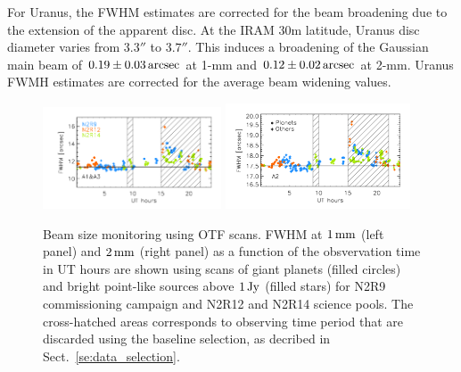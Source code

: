 For Uranus, the FWHM estimates are corrected for the beam broadening due
to the extension of the apparent disc. At the IRAM 30m latitude,
Uranus disc diameter varies from $3.3''$ to $3.7''$. This induces a
broadening of the Gaussian main beam of $0.19 \pm 0.03\,\rm{arcsec}$ at
1-mm and $0.12 \pm 0.02\,\rm{arcsec}$ at 2-mm. Uranus FWMH estimates are
corrected for the average beam widening values. 

\begin{figure}[ht!]
  \begin{center}
    \includegraphics[clip=true, trim={0.9cm, 0.5cm, 0.5cm, 0.5cm}, width=0.4725\textwidth]{Figures/Beams/Beam_monitoring_with_otfs_vs_ut_1mm.pdf}
    \includegraphics[clip=true, trim={0.5cm, 0.5cm, 0.5cm, 0.5cm}, width=0.4875\textwidth]{Figures/Beams/Beam_monitoring_with_otfs_vs_ut_a2.pdf}
    \caption[Beam size monitoring using OTF scans]{Beam size
      monitoring using OTF scans. FWHM at $1\,\rm{mm}$ (left panel)
      and $2\,\rm{mm}$ (right panel) as a function of the
      obsvervation time in UT hours are shown using scans of giant
      planets (filled circles) and bright point-like sources above
      $1\,\rm{Jy}$ (filled stars) for N2R9 commissioning campaign and
      N2R12 and N2R14 science pools. The cross-hatched areas
      corresponds to observing time period that are discarded using
      the baseline selection, as decribed in Sect.~\ref{se:data_selection}.} 
\label{fig:beam_monitoring_otf}
  \end{center}
\end{figure}

